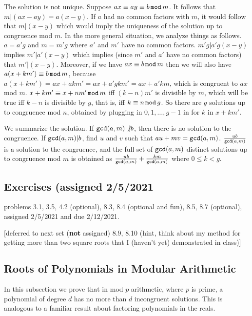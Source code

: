 \documentclass[12pt]{article}
\begin{document}
The solution is not unique.  Suppose $ax\equiv ay \equiv b\,{\tt mod}\,m$.   It follows that $m|(ax-ay)=a(x-y)$.
If $a$ had no common factors with $m$, it would follow that $m|(x-y)$ which would imply the uniqueness of the solution
up to congruence mod $m$.  In the more general situation, we analyze things as follows.  $a=a'g$ and $m=m'g$
where $a'$ and $m'$ have no common factors.  $m'g | a'g(x-y)$ implies $m' | a'(x-y)$ which implies (since $m'$ and
$a'$ have no common factors) that $m' | (x-y)$.   Moreover, if we have $ax \equiv b\,{\tt mod}\,m$ then we will also
have $a(x+km')\equiv b\,{\tt mod}\,m$, because $a(x+km')=ax+akm'=ax+a'gkm'=ax+a'km$, which is congruent to
$ax$ mod $m$.   $x+km' \equiv x+nm'\,{\tt mod}\,m$ iff $(k-n)m'$ is divisible by $m$, which will be true iff
$k-n$ is divisible by $g$, that is, iff $k \equiv n \,{\tt mod}\,g$.   So there are $g$ solutions up to congruence
mod $n$, obtained by plugging in $0,1,\ldots,g-1$ in for $k$ in $x+km'$.

We summarize the solution.   If ${\tt gcd}(a,m)\not|b$, then there is no solution to the congruence.
If ${\tt gcd}(a,m)|b$, find $u$ and $v$ such that $au+mv={\tt gcd}(a,m)$.  $\frac{ub}{{\tt gcd}(a,m)}$ is a solution to the congruence, and the full set of ${\tt gcd}(a,m)$ distinct solutions up to congruence mod $m$ is obtained
as $\frac{ub}{{\tt gcd}(a,m)}+\frac{km}{{\tt gcd}(a,m)}$ where $0 \leq k<g$. 

\subsection{Exercises (assigned 2/5/2021}

problems 3.1, 3.5, 4.2 (optional), 8.3, 8.4 (optional and fun), 8.5, 8.7 (optional), assigned 2/5/2021 and due 2/12/2021.

[deferred to next set ({\bf not} assigned) 8.9, 8.10 (hint, think about my method for getting more than two square roots that I (haven't yet) demonstrated in class)]


\subsection{Roots of Polynomials in Modular Arithmetic}

In this subsection we prove that in mod $p$ arithmetic, where $p$ is prime, a polynomial of degree $d$ has
no more than $d$ incongruent solutions.   This is analogous to a familiar result about factoring polynomials in the reals.
\end{document}
